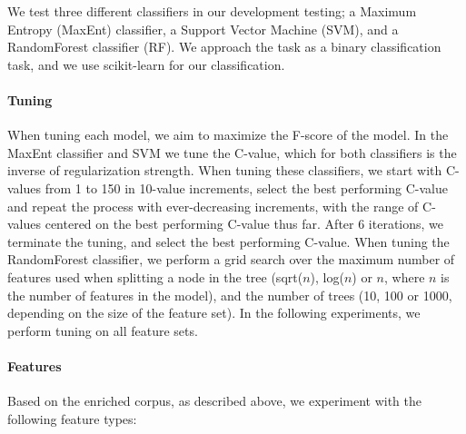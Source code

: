 \documentclass[11pt,letterpaper]{article}
\begin{document}
We test three different classifiers in our development testing; a Maximum Entropy (MaxEnt) classifier, a Support Vector Machine (SVM), and a RandomForest classifier (RF).  We approach the task as a binary classification task, and we use scikit-learn \cite{scikit-learn} for our classification.

\paragraph{Tuning}
When tuning each model, we aim to maximize the F-score of the model. In the MaxEnt classifier and SVM we tune the C-value, which for both classifiers is the inverse of regularization strength. When tuning these classifiers, we start with C-values from 1 to 150 in 10-value increments, select the best performing C-value and repeat the process with ever-decreasing increments, with the range of C-values centered on the best performing C-value thus far. After 6 iterations, we terminate the tuning, and select the best performing C-value. When tuning the RandomForest classifier, we perform a grid search over the maximum number of features used when splitting a node in the tree (sqrt($n$), log($n$) or $n$, where $n$ is the number of features in the model), and the number of trees (10, 100 or 1000, depending on the size of the feature set). In the following experiments, we perform tuning on all feature sets.


\paragraph{Features}
Based on the enriched corpus, as described above, we experiment with the following feature types:
\end{document}
